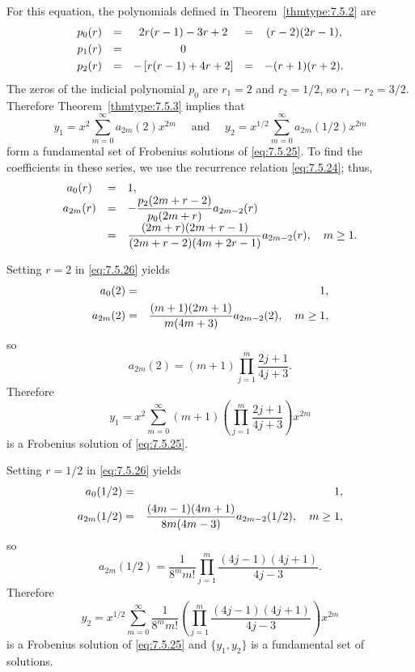 \begin{examplesolution}
\solution For this equation, the polynomials defined in Theorem~\ref{thmtype:7.5.2} are
\[
  \begin{array}{ccccc}
    p_{0}(r) & = & 2r(r-1)-3r+2              & = & (r-2)(2r-1), \\[1\jot]
    p_{1}(r) & = & 0                          \\[1\jot]
    p_{2}(r) & = & -\left[r(r-1)+4r+2\right] & = & -(r+1)(r+2).
  \end{array}
\]
The zeros of the indicial polynomial $p_{0}$ are $r_{1}=2$ and $r_{2}=1/2$, so $r_{1}-r_{2}=3/2$.
Therefore Theorem~\ref{thmtype:7.5.3} implies that
\[
  y_{1}=x^{2}\sum_{m=0}^{\infty}a_{2m}(2)x^{2m}\quad\mbox{ and }\quad y_{2}=x^{1/2}\sum_{m=0}^{\infty}a_{2m}(1/2)x^{2m}
\]
form a fundamental set of Frobenius solutions of \eqref{eq:7.5.25}. To find the coefficients in
these series, we use the recurrence relation \eqref{eq:7.5.24}; thus,
\begin{equation}
  \label{eq:7.5.26}
  \begin{array}{ccl}
    a_{0}(r)  & = & 1,                                                                   \\
    a_{2m}(r) & = & -\displaystyle\frac{p_{2}(2m+r-2)}{p_{0}(2m+r)}a_{2m-2}(r)                    \\[2\jot]
              & = & \displaystyle\frac{(2m+r)(2m+r-1)}{(2m+r-2)(4m+2r-1)}a_{2m-2}(r),\quad m\ge1.
  \end{array}
\end{equation}

Setting $r=2$ in \eqref{eq:7.5.26} yields
\begin{eqnarray*}
  a_{0}(2)  & = & 1, \\
  a_{2m}(2) & = & \displaystyle\frac{(m+1)(2m+1)}{m(4m+3)}a_{2m-2}(2),\quad m\ge1,
\end{eqnarray*}
so
\[
  a_{2m}(2)=(m+1)\prod_{j=1}^{m}\frac{2j+1}{4j+3}.
\]
Therefore
\[
  y_{1}=x^{2}\sum_{m=0}^{\infty}(m+1)\left(\prod_{j=1}^{m}\frac{2j+1}{4j+3}\right)x^{2m}
\]
is a Frobenius solution of \eqref{eq:7.5.25}.

Setting $r=1/2$ in \eqref{eq:7.5.26} yields
\begin{eqnarray*}
  a_{0}(1/2)  & = & 1, \\
  a_{2m}(1/2) & = & \displaystyle\frac{(4m-1)(4m+1)}{8m(4m-3)}a_{2m-2}(1/2),\quad m\ge1,
\end{eqnarray*}
so
\[
  a_{2m}(1/2)=\frac{1}{8^{m}m!}\prod_{j=1}^{m}\frac{(4j-1)(4j+1)}{4j-3}.
\]
Therefore
\[
  y_{2}=x^{1/2}\sum_{m=0}^{\infty}\frac{1}{8^{m}m!}\left(\prod_{j=1}^{m}\frac{(4j-1)(4j+1)}{4j-3}\right)x^{2m}
\]
is a Frobenius solution of \eqref{eq:7.5.25} and $\{y_{1},y_{2}\}$ is a fundamental set of
solutions.
\end{examplesolution}

